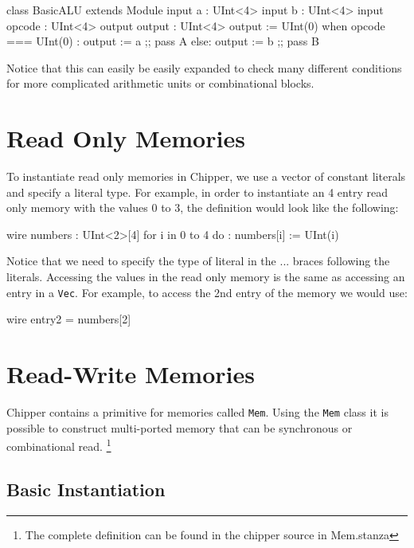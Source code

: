 \begin{stanza}
class BasicALU extends Module {
  input  a      : UInt<4>
  input  b      : UInt<4>
  input  opcode : UInt<4>
  output output : UInt<4>
  }
  output := UInt(0) 
  when opcode === UInt(0) :
    output := a                   ;; pass A
  else: 
    output := b                   ;; pass B
\end{stanza}

Notice that this can easily be easily expanded to check many different conditions for more complicated arithmetic units or combinational blocks.

\section{Read Only Memories}

To instantiate read only memories in Chipper, we use a vector of constant literals and specify a literal type. For example, in order to instantiate an 4 entry read only memory with the values 0 to 3, the definition would look like the following:

\begin{footnotesize}
\begin{stanza}
wire numbers : UInt<2>[4]
for i in 0 to 4 do :
  numbers[i] := UInt(i)
\end{stanza}
\end{footnotesize}

Notice that we need to specify the type of literal in the {...} braces following the literals. Accessing the values in the read only memory is the same as accessing an entry in a \verb+Vec+. For example, to access the 2nd entry of the memory we would use:

\begin{stanza}
wire entry2 = numbers[2]
\end{stanza}

\section{Read-Write Memories}

Chipper contains a primitive for memories called \verb+Mem+. Using the \verb+Mem+ class it is possible to construct multi-ported memory that can be synchronous or combinational read. \footnote{The complete definition can be found in the chipper source in  Mem.stanza}

\subsection{Basic Instantiation}

